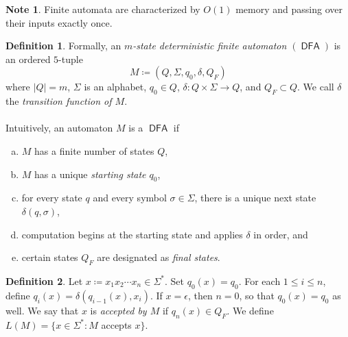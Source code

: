 \documentclass[10pt,letterpaper,cm]{nupset}
\theoremstyle{definition}
\newtheorem*{definition}{Definition}
\newtheorem{note}{Note}
\newcommand{\1}{\mathbf{1}}
\newcommand{\0}{\vec 0}
\DeclareMathOperator{\DFA}{\mathsf{DFA}}
\begin{document}
\begin{note}
Finite automata are characterized by $O(1)$ memory and passing over their inputs exactly once.
\end{note}
\begin{definition}
Formally, an \textit{$m$-state deterministic finite automaton $(\DFA)$}  is an ordered $5$-tuple $$M\coloneqq (Q, \Sigma, q_0, \delta, Q_F)  $$ where  $|Q| = m$, $\Sigma$ is an alphabet, $q_0\in Q$, $\delta : Q\times \Sigma \to Q$, and $Q_F\subset Q$. We call $\delta$ the \textit{transition function of $M$}.
\\ \\
Intuitively, an automaton $M$ is a $\DFA$ if
\begin{enumerate}[(a)]
\item $M$ has a finite number of states $Q$,
\item $M$ has a unique \textit{starting state $q_0$},
\item for every state $q$ and every symbol $\sigma \in \Sigma$, there is a unique next state $\delta(q, \sigma)$,
\item computation begins at the starting state and applies $\delta$ in order, and
\item certain states $Q_F$ are designated as \textit{final states}.
\end{enumerate}
\end{definition}

\begin{definition}
Let $x\coloneqq x_1x_2\cdots x_n \in \Sigma^{\ast}$. Set $q_0(x) = q_0$. For each $1\leq i\leq n$, define $q_i(x) =\delta(q_{i-1}(x), x_i)$. If $x= \epsilon$, then $n=0$, so that $q_0(x) = q_0$ as well. We say that $x$ is \textit{accepted by $M$} if $q_n(x) \in Q_F$. We define $L(M) =\{x\in \Sigma^{\ast} : M$ accepts $x\}$.
\end{definition}
\end{document}
